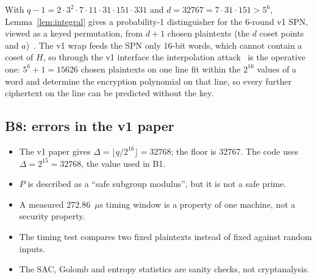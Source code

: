 \documentclass[10pt,a4paper]{article}
\theoremstyle{definition}
\theoremstyle{remark}
\begin{document}
With $q-1 = 2\cdot3^2\cdot7\cdot11\cdot31\cdot151\cdot331$ and $d = 32767 = 7\cdot31\cdot151 > 5^6$, Lemma~\ref{lem:integral} gives a probability-1 distinguisher for the 6-round v1 SPN, viewed as a keyed permutation, from $d+1$ chosen plaintexts (the $d$ coset points and $a$)~\cite{knudsenwagner}. The v1 wrap feeds the SPN only 16-bit words, which cannot contain a coset of $H$, so through the v1 interface the interpolation attack~\cite{jk97} is the operative one: $5^6 + 1 = 15626$ chosen plaintexts on one line fit within the $2^{16}$ values of a word and determine the encryption polynomial on that line, so every further ciphertext on the line can be predicted without the key.

\subsection{B8: errors in the v1 paper}
\begin{itemize}
  \item The v1 paper gives $\Delta = \lfloor q/2^{16}\rfloor = 32768$; the floor is 32767. The code uses $\Delta = 2^{15} = 32768$, the value used in B1.
  \item $P$ is described as a ``safe subgroup modulus'', but it is not a safe prime.
  \item A measured 272.86~$\mu$s timing window is a property of one machine, not a security property.
  \item The timing test compares two fixed plaintexts instead of fixed against random inputs.
  \item The SAC, Golomb and entropy statistics are sanity checks, not cryptanalysis.
\end{itemize}
\end{document}
